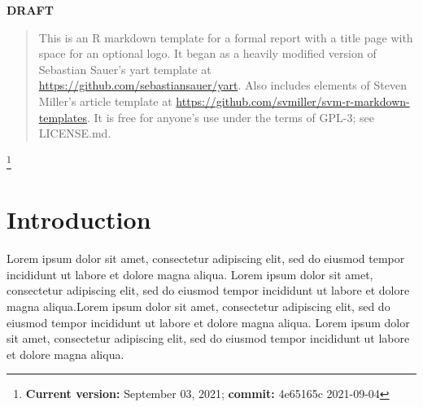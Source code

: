 \documentclass[
  11pt,
  american,
  letterpaper,
  ]{article}
\renewcommand{\normalfont}{\mymainfont}
\newcommand\blfootnote[1]{%
  \begingroup
  \renewcommand\thefootnote{}\footnote{#1}%
  \addtocounter{footnote}{-1}%
  \endgroup
}
\newcommand*{\supersection}[1]{\label{ #1}\noindent\Large\bfseries #1}
\begin{document}
\begin{titlingpage}
\begin{center}
        {\sffamily\LARGE%
        \color{ForestGreen}%
        \textbf{DRAFT}}%
      
      
    \end{center}
    \thispagestyle{empty}
  \end{titlingpage}

\normalfont

\newpage
\pagestyle{plain}

  \patchcmd{\abstract}{\small}{\large}{}{}

  \renewcommand{\abstractname}{\supersection{Abstract}\\ \vspace{0.5cm}}

  \begin{abstract}
    \noindent This is an R markdown template for a formal report with a
title page with space for an optional logo. It began as a heavily
modified version of Sebastian Sauer's yart template at
\url{https://github.com/sebastiansauer/yart}. Also includes elements of
Steven Miller's article template at
\url{https://github.com/svmiller/svm-r-markdown-templates}. It is free
for anyone's use under the terms of GPL-3; see LICENSE.md.
  \end{abstract}
  \newpage


  {
          \hypersetup{linkcolor=black}
        \newpage
    \setcounter{tocdepth}{3}
    \tableofcontents
  }

    \listoffigures

    \listoftables

\normalfont
\newpage
{}

\blfootnote{\textbf{Current version:} September 03, 2021; \textbf{commit:} 4e65165c 2021-09-04}

\hypertarget{introduction}{%
\section{Introduction}\label{introduction}}

Lorem ipsum dolor sit amet, consectetur adipiscing elit, sed do eiusmod
tempor incididunt ut labore et dolore magna aliqua. Lorem ipsum dolor
sit amet, consectetur adipiscing elit, sed do eiusmod tempor incididunt
ut labore et dolore magna aliqua.Lorem ipsum dolor sit amet, consectetur
adipiscing elit, sed do eiusmod tempor incididunt ut labore et dolore
magna
aliqua.\autocite{nyserdaNewYorkState2019}\autocite{epaInventoryGreenhouseGas2017}
Lorem ipsum dolor sit amet, consectetur adipiscing elit, sed do eiusmod
tempor incididunt ut labore et dolore magna aliqua.
\end{document}
